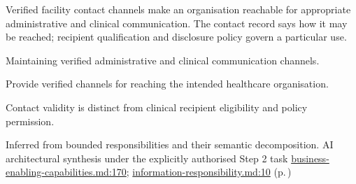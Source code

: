 Verified facility contact channels make an organisation reachable for appropriate administrative and clinical communication. The contact record says how it may be reached; recipient qualification and disclosure policy govern a particular use.



Maintaining verified administrative and clinical communication channels.



Provide verified channels for reaching the intended healthcare organisation.



Contact validity is distinct from clinical recipient eligibility and policy permission.


Inferred from bounded responsibilities and their semantic decomposition. AI architectural synthesis under the explicitly authorised Step 2 task \hyperref[evidence:e01893359d483acf]{business-enabling-capabilities.md:170}; \hyperref[evidence:be61392fefb4bb10]{information-responsibility.md:10}
 (p.\,\pageref{cap:bec-healthcare-organisation})
